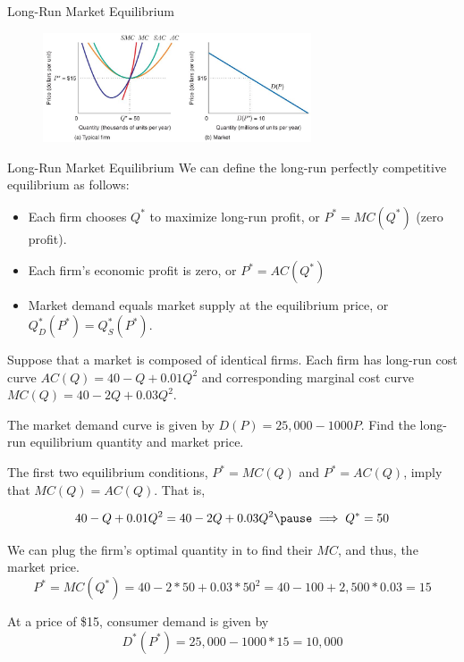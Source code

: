 \documentclass[11pt,t]{beamer}
\begin{document}
\begin{frame}{Long-Run Market Equilibrium}
  \begin{figure}
    \includegraphics[width=300px]{figures/fig9_14.jpg}
  \end{figure}
\end{frame}

\begin{frame}{Long-Run Market Equilibrium}
  We can define the long-run perfectly competitive equilibrium as follows:
  
  \bigskip
  \begin{itemize}
    \item Each firm chooses $Q^*$ to maximize long-run profit, or $P^* = MC(Q^*)$ (zero profit).

    \item Each firm's economic profit is zero, or $P^* = AC(Q^*)$

    \item Market demand equals market supply at the equilibrium price, or $Q^*_D(P^*)=Q^*_S(P^*)$.
  \end{itemize}
\end{frame}

\begin{frame}{}
  Suppose that a market is composed of identical firms. Each firm has long-run cost curve $AC(Q) = 40 - Q + 0.01Q^2$ and corresponding marginal cost curve $MC(Q) = 40 - 2Q + 0.03Q^2$. 
  
  \bigskip
  The market demand curve is given by $D(P) = 25,000 - 1000P$. Find the long-run equilibrium quantity and market price.

  \bigskip\pause
  The first two equilibrium conditions, $P^* = MC(Q)$ and $P^* = AC(Q)$, imply that $MC(Q) = AC(Q)$. That is,

  $$
    40 - Q + 0.01Q^2 = 40 - 2Q + 0.03Q^2 \pause\implies Q^* = 50
  $$
\end{frame}

\begin{frame}{}
  We can plug the firm's optimal quantity in to find their $MC$, and thus, the market price.
  $$
    P^* = MC(Q^*) = 40 - 2*50 + 0.03*50^2 = 40 - 100 + 2,500 * 0.03 = 15
  $$

  \bigskip\pause
  At a price of \$15, consumer demand is given by 
  $$
    D^*(P^*) = 25,000 - 1000*15 = 10,000
  $$
\end{frame}
\end{document}
